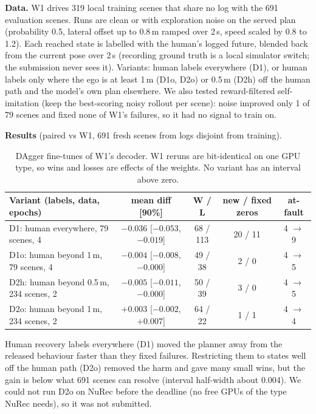 \documentclass{article}
\begin{document}
\textbf{Data.} W1 drives 319 local training scenes that share no log with the 691 evaluation scenes. Runs are clean
or with exploration noise on the served plan (probability 0.5, lateral offset up to 0.8\,m ramped over 2\,s, speed
scaled by 0.8 to 1.2). Each reached state is labelled with the human's logged future, blended back from the current
pose over 2\,s (recording ground truth is a local simulator switch; the submission never sees it). Variants:
human labels everywhere (D1), or human labels only where the ego is at least 1\,m (D1o, D2o) or 0.5\,m (D2h) off the
human path and the model's own plan elsewhere. We also tested reward-filtered self-imitation (keep the
best-scoring noisy rollout per scene): noise improved only 1 of 79 scenes and fixed none of W1's failures, so it had
no signal to train on.

\textbf{Results} (paired vs W1, 691 fresh scenes from logs disjoint from training).
\begin{table}[h]
\centering\footnotesize\setlength{\tabcolsep}{4pt}
\begin{tabular}{lcccc}
\toprule
Variant (labels, data, epochs) & mean diff [90\%] & W / L & new / fixed zeros & at-fault \\
\midrule
D1: human everywhere, 79 scenes, 4 & $-0.036$ [$-0.053$, $-0.019$] & 68 / 113 & 20 / 11 & 4 $\rightarrow$ 9 \\
D1o: human beyond 1\,m, 79 scenes, 4 & $-0.004$ [$-0.008$, $-0.000$] & 49 / 38 & 2 / 0 & 4 $\rightarrow$ 5 \\
D2h: human beyond 0.5\,m, 234 scenes, 2 & $-0.005$ [$-0.011$, $-0.000$] & 50 / 39 & 3 / 0 & 4 $\rightarrow$ 5 \\
D2o: human beyond 1\,m, 234 scenes, 2 & $+0.003$ [$-0.002$, $+0.007$] & 64 / 22 & 1 / 1 & 4 $\rightarrow$ 4 \\
\bottomrule
\end{tabular}
\caption{DAgger fine-tunes of W1's decoder. W1 reruns are bit-identical on one GPU type, so wins and losses
are effects of the weights. No variant has an interval above zero.}
\label{tab:dagger}
\end{table}
Human recovery labels everywhere (D1) moved the planner away from the released behaviour faster than they fixed
failures. Restricting them to states well off the human path (D2o) removed the harm and gave many small wins, but
the gain is below what 691 scenes can resolve (interval half-width about 0.004). We could not run D2o on NuRec before the deadline (no free GPUs of the type NuRec needs), so it was not submitted.
\end{document}
